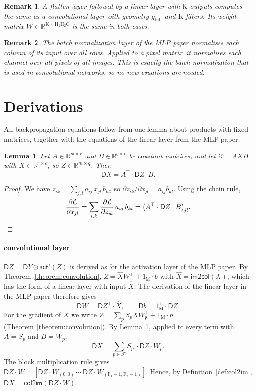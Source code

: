 \documentclass[twoside,11pt]{article}
\newtheorem{lemma}{Lemma}
\newtheorem{remark}{Remark}
\newcommand{\const}[1]{\ensuremath{\mathrm{#1}}} %
\newcommand{\func}[1]{\ensuremath{\textsf{#1}}}  %
\newcommand{\Gradient}{\textsf{D}}
\newcommand{\Derivative}[2]{\ensuremath{\frac{\partial #1}{\partial #2}}}
\newcommand{\Reals}{\mathbb{R}}
\newcommand{\Hin}{\const{H}}         %
\newcommand{\Fs}{\const{F}}          %
\newcommand{\im}{\func{im2col}}
\newcommand{\ci}{\func{col2im}}
\newcommand{\Pos}{\mathcal{F}}       %
\begin{document}
\begin{remark}
A flatten layer followed by a linear layer with $\const{K}$ outputs computes the same as a convolutional layer with geometry $g_\text{full}$ and $\const{K}$ filters. Its weight matrix $W \in \Reals^{\const{K} \times \Hin_1\Hin_2\const{C}}$ is the same in both cases.
\end{remark}

\begin{remark}
The batch normalization layer of the MLP paper normalises each column of its input over all rows. Applied to a pixel matrix, it normalises each channel over all pixels of all images. This is exactly the batch normalization that is used in convolutional networks, so no new equations are needed.
\end{remark}

\section{Derivations} \label{section:derivations}

All backpropagation equations follow from one lemma about products with fixed matrices, together with the equations of the linear layer from the MLP paper.

\begin{lemma} \label{lemma:product-gradient}
Let $A \in \Reals^{m \times r}$ and $B \in \Reals^{q \times c}$ be constant matrices, and let $Z = A X B^\top$ with $X \in \Reals^{r \times c}$, so $Z \in \Reals^{m \times q}$. Then
\[
\Gradient X = A^\top \cdot \Gradient Z \cdot B.
\]
\end{lemma}
\begin{proof}
We have $z_{ik} = \sum_{j,l} a_{ij}\, x_{jl}\, b_{kl}$, so $\partial z_{ik} / \partial x_{jl} = a_{ij} b_{kl}$. Using the chain rule,
\[
\Derivative{\mathcal{L}}{x_{jl}} = \sum_{i,k} \Derivative{\mathcal{L}}{z_{ik}}\, a_{ij}\, b_{kl} = \big(A^\top \cdot \Gradient Z \cdot B\big)_{jl}. \qedhere
\]
\end{proof}

\paragraph{convolutional layer}
$\Gradient Z = \Gradient Y \odot \func{act}'(Z)$ is derived as for the activation layer of the MLP paper.
By Theorem~\ref{theorem:convolution}, $Z = \hat X W^\top + 1_\const{M} \cdot b$ with $\hat X = \im(X)$, which has the form of a linear layer with input $\hat X$. The derivation of the linear layer in the MLP paper therefore gives
\[
\Gradient W = \Gradient Z^\top \cdot \hat X, \qquad
\Gradient b = 1_\const{M}^\top \cdot \Gradient Z.
\]
For the gradient of $X$ we write $Z = \sum_p S_p X W_p^\top + 1_\const{M} \cdot b$ (Theorem~\ref{theorem:convolution}).
By Lemma~\ref{lemma:product-gradient}, applied to every term with $A = S_p$ and $B = W_p$,
\[
\Gradient X = \sum_{p \in \Pos} S_p^\top \cdot \Gradient Z \cdot W_p.
\]
The block multiplication rule gives $\Gradient Z \cdot W = [\Gradient Z \cdot W_{(0,0)} \ \cdots \ \Gradient Z \cdot W_{(\Fs_1-1,\Fs_2-1)}]$. Hence, by Definition~\ref{def:col2im}, $\Gradient X = \ci(\Gradient Z \cdot W)$.
\end{document}
